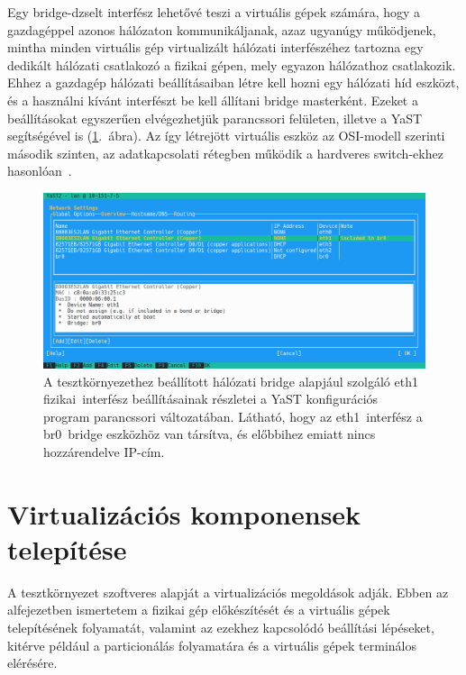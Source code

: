 Egy bridge-dzselt interfész lehetővé teszi a virtuális gépek számára, hogy a gazdagéppel azonos hálózaton kommunikáljanak, azaz ugyanúgy működjenek, mintha minden virtuális gép virtualizált hálózati interfészéhez tartozna egy dedikált hálózati csatlakozó a fizikai gépen, mely egyazon hálózathoz csatlakozik. Ehhez a gazdagép hálózati beállításaiban létre kell hozni egy hálózati híd eszközt, és a használni kívánt interfészt be kell állítani bridge masterként.
Ezeket a beállításokat egyszerűen elvégezhetjük parancssori felületen, illetve a YaST segítségével is (\ref{fig:yast-net-bridge}.~ábra). Az így létrejött virtuális eszköz az OSI-modell szerinti második szinten, az adatkapcsolati rétegben működik a hardveres switch-ekhez hasonlóan~\cite{SUSENetBridge}.

\begin{figure}[ht]
	\centering
	\includegraphics[width=15cm]{figures/yast-br0.png}
	\caption{A tesztkörnyezethez beállított hálózati bridge alapjául szolgáló eth1 fizikai~interfész beállításainak részletei a YaST konfigurációs program parancssori változatában. Látható, hogy az eth1~interfész a br0~bridge eszközhöz van társítva, és előbbihez emiatt nincs hozzárendelve IP-cím.}
	\label{fig:yast-net-bridge}
\end{figure}

\section{Virtualizációs komponensek telepítése}
A tesztkörnyezet szoftveres alapját a virtualizációs megoldások adják. Ebben az alfejezetben ismertetem a fizikai gép előkészítését és a virtuális gépek telepítésének folyamatát, valamint az ezekhez kapcsolódó beállítási lépéseket, kitérve például a particionálás folyamatára és a virtuális gépek terminálos elérésére.

